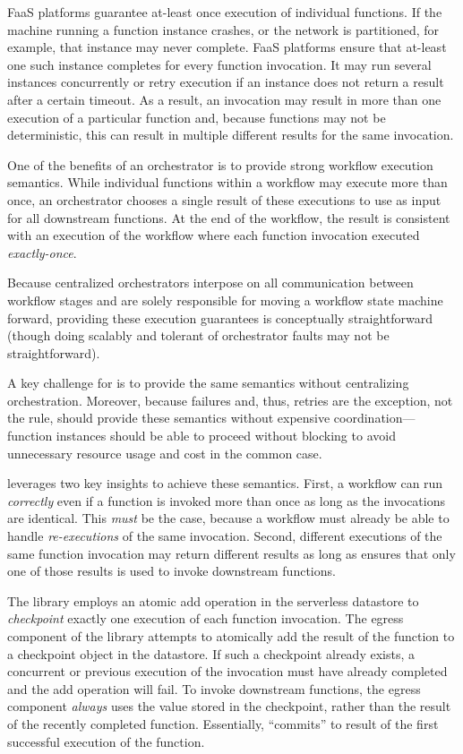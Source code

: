 FaaS platforms guarantee at-least once execution of individual functions. If the
machine running a function instance crashes, or the network is partitioned, for
example, that instance may never complete. FaaS platforms ensure that at-least
one such instance completes for every function invocation. It may run several
instances concurrently or retry execution if an instance does not return a
result after a certain timeout. As a result, an invocation may result in more
than one execution of a particular function and, because functions may not be
deterministic, this can result in multiple different results for the same
invocation.

One of the benefits of an orchestrator is to provide strong workflow execution
semantics. While individual functions within a workflow may execute more than
once, an orchestrator chooses a single result of these executions to use as
input for all downstream functions. At the end of the workflow, the result is
consistent with an execution of the workflow where each function invocation
executed \emph{exactly-once}.

Because centralized orchestrators interpose on all communication between
workflow stages and are solely responsible for moving a workflow state machine
forward, providing these execution guarantees is conceptually straightforward
(though doing scalably and tolerant of orchestrator faults may not be
straightforward).

A key challenge for \name{} is to provide the same semantics without
centralizing orchestration. Moreover, because failures and, thus, retries are
the exception, not the rule, \name{} should provide these semantics without
expensive coordination---function instances should be able to proceed without
blocking to avoid unnecessary resource usage and cost in the common case.

\name{} leverages two key insights to achieve these semantics. First, a workflow
can run \emph{correctly} even if a function is invoked more than once as long as
the invocations are identical. This \emph{must} be the case, because a workflow
must already be able to handle \emph{re-executions} of the same invocation.
Second, different executions of the same function invocation may return
different results as long as \name{} ensures that only one of those results is
used to invoke downstream functions.

The \name{} library employs an atomic add operation in the serverless datastore
to \emph{checkpoint} exactly one execution of each function invocation. The
egress component of the \name{} library attempts to atomically add the result of
the function to a checkpoint object in the datastore. If such a checkpoint
already exists, a concurrent or previous execution of the invocation must have
already completed and the add operation will fail. To invoke downstream
functions, the egress component \emph{always} uses the value stored in the
checkpoint, rather than the result of the recently completed function.
Essentially, \name{} ``commits'' to result of the first successful execution of
the function.

